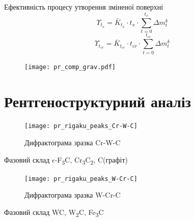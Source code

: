 \documentclass[12pt,aspectratio=43,hyperref={unicode}]{beamer}
\begin{document}
\begin{frame}
\vspace{-0.2cm}
\begin{exampleblock}{Ефективність процесу утворення зміненої поверхні}\vspace{-0.5cm}
\begin{equation}
\Upsilon_{t_x} = \bar{K}_{t_x} \cdot t_x \cdot \sum_{t=0}^{t_x} \Delta m_t^k
\label{eq:effectiveness_coef_x}
\end{equation}
\begin{equation}
\Upsilon_{t_{cr}} = \bar{K}_{t_{cr}} \cdot t_{cr} \cdot \sum_{t=0}^{t_{cr}} \Delta m_t^k
\label{eq:effectiveness_coef_cr}
\end{equation}
\end{exampleblock}

\vspace{-0.2cm}
\begin{figure}[H]
\centering
\label{fig:comp_grav}
\texttt{[image: pr\_comp\_grav.pdf]}
\end{figure}
\end{frame}

\section{Рентгеноструктурний аналіз}

\begin{frame}
\begin{figure}[H]
\centering
\caption{Дифрактограма зразка Cr-W-C}
\texttt{[image: pr\_rigaku\_peaks\_Cr-W-C]}
\end{figure}
\begin{alertblock}{Фазовий склад}
\centering
  $\epsilon\text{-}$F\textsubscript{3}C, Cr\textsubscript{3}C\textsubscript{2}, C(графіт)
\end{alertblock}
\end{frame}

\begin{frame}
\begin{figure}[H]
\centering
\caption{Дифрактограма зразка W-Cr-C}
\texttt{[image: pr\_rigaku\_peaks\_W-Cr-C]}
\end{figure}
\begin{alertblock}{Фазовий склад}
\centering
  WC, W\textsubscript{2}C, Fe\textsubscript{3}C
\end{alertblock}
\end{frame}
\end{document}
